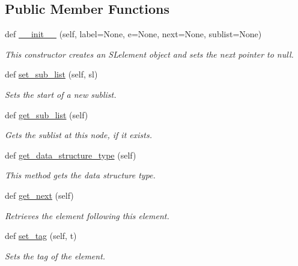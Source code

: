 \subsection*{Public Member Functions}
\begin{DoxyCompactItemize}
\item 
def \mbox{\hyperlink{class_bridges_1_1ml__element_1_1_m_lelement_a65f558578e90caac70a98e3e727cac38}{\+\_\+\+\_\+init\+\_\+\+\_\+}} (self, label=None, e=None, next=None, sublist=None)
\begin{DoxyCompactList}\small\item\em This constructor creates an S\+Lelement object and sets the next pointer to null. \end{DoxyCompactList}\item 
def \mbox{\hyperlink{class_bridges_1_1ml__element_1_1_m_lelement_ae1d401e972853ffab974aaa1dd44ab0e}{set\+\_\+sub\+\_\+list}} (self, sl)
\begin{DoxyCompactList}\small\item\em Sets the start of a new sublist. \end{DoxyCompactList}\item 
def \mbox{\hyperlink{class_bridges_1_1ml__element_1_1_m_lelement_ab60b9e960312e5210793bff87a6b81c8}{get\+\_\+sub\+\_\+list}} (self)
\begin{DoxyCompactList}\small\item\em Gets the sublist at this node, if it exists. \end{DoxyCompactList}\item 
def \mbox{\hyperlink{class_bridges_1_1ml__element_1_1_m_lelement_a66dc302580aedb52f17d138c54deceb2}{get\+\_\+data\+\_\+structure\+\_\+type}} (self)
\begin{DoxyCompactList}\small\item\em This method gets the data structure type. \end{DoxyCompactList}\item 
def \mbox{\hyperlink{class_bridges_1_1ml__element_1_1_m_lelement_ab4035d339d6133c3b2aab19028aafdf2}{get\+\_\+next}} (self)
\begin{DoxyCompactList}\small\item\em Retrieves the element following this element. \end{DoxyCompactList}\item 
def \mbox{\hyperlink{class_bridges_1_1ml__element_1_1_m_lelement_a5f093a6896365033a3a658a81b0024fe}{set\+\_\+tag}} (self, t)
\begin{DoxyCompactList}\small\item\em Sets the tag of the element. \end{DoxyCompactList}\item 

\end{DoxyCompactItemize}
